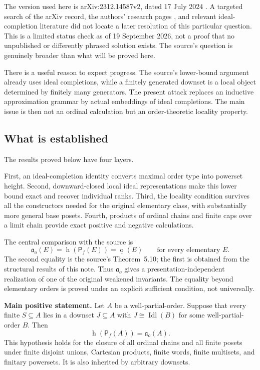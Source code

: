 \documentclass[11pt,letterpaper]{article}
\theoremstyle{teal}
\theoremstyle{definition}
\newcommand{\Pf}{\mathsf P_{\!f}}
\newcommand{\Idl}{\operatorname{Idl}}
\newcommand{\hgt}{\operatorname{h}}
\newcommand{\mot}{\operatorname{o}}
\newcommand{\ao}{\mathfrak a_o}
\begin{document}
The version used here is arXiv:2312.14587v2, dated 17 July 2024 \cite{AHLLSSV}. A targeted search of the arXiv record, the authors' research pages \cite{VialardPage}, and relevant ideal-completion literature did not locate a later resolution of this particular question. This is a limited status check as of 19 September 2026, not a proof that no unpublished or differently phrased solution exists. The source's question is genuinely broader than what will be proved here.

There is a useful reason to expect progress. The source's lower-bound argument already uses ideal completions, while a finitely generated downset is a local object determined by finitely many generators. The present attack replaces an inductive approximation grammar by actual embeddings of ideal completions. The main issue is then not an ordinal calculation but an order-theoretic locality property.

\subsection{What is established}
The results proved below have four layers.

First, an ideal-completion identity converts maximal order type into powerset height. Second, downward-closed local ideal representations make this lower bound exact and recover individual ranks. Third, the locality condition survives all the constructors needed for the original elementary class, with substantially more general base posets. Fourth, products of ordinal chains and finite caps over a limit chain provide exact positive and negative calculations.

The central comparison with the source is
\begin{equation}\label{eq:agreement-intro}
 \ao(E)=\hgt(\Pf(E))=\underline{\mot}(E)
 \qquad\text{for every elementary $E$}.
\end{equation}
The second equality is the source's Theorem~5.10; the first is obtained from the structural results of this note. Thus $\ao$ gives a presentation-independent realization of one of the original weakened invariants. The equality beyond elementary orders is proved under an explicit sufficient condition, not universally.

\begin{resultbox}
\textbf{Main positive statement.} Let $A$ be a well-partial-order. Suppose that every finite $S\subseteq A$ lies in a downset $J\subseteq A$ with $J\cong\Idl(B)$ for some well-partial-order $B$. Then
\[
 \hgt(\Pf(A))=\ao(A).
\]
This hypothesis holds for the closure of all ordinal chains and all finite posets under finite disjoint unions, Cartesian products, finite words, finite multisets, and finitary powersets. It is also inherited by arbitrary downsets.
\end{resultbox}
\end{document}
